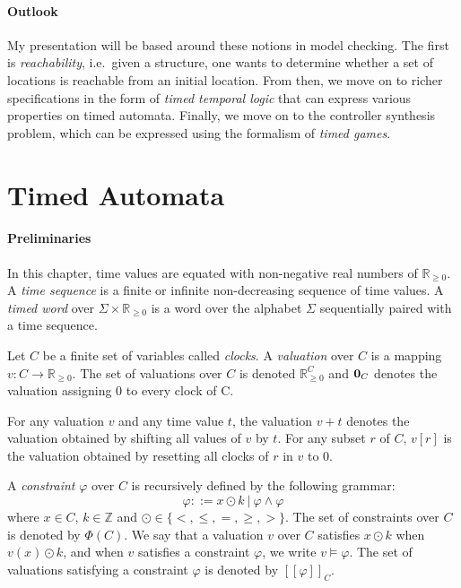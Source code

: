\documentclass[11pt]{article}
\theoremstyle{definition}
\theoremstyle{remark}
\theoremstyle{definition}
\begin{document}
\paragraph{Outlook} My presentation will be based around these notions in model checking. The first is \emph{reachability}, i.e.\ given a structure, one wants to determine whether a set of locations is reachable from an initial location.
From then, we move on to richer specifications in the form of \emph{timed temporal logic} that can express various properties on timed automata.
Finally, we move on to the controller synthesis problem, which can be expressed using the formalism of \emph{timed games}.

\section{Timed Automata}\label{sec:ta}
\paragraph{Preliminaries}\label{par:prelims}
In this chapter, time values are equated with non-negative real numbers of $\mathbb{R}_{\geq 0}$. A \emph{time sequence} is a finite or infinite non-decreasing sequence of time values.
A \emph{timed word} over $\Sigma \times \mathbb{R}_{\geq 0}$ is a word over the alphabet $\Sigma$ sequentially paired with a time sequence.

Let $C$ be a finite set of variables called \emph{clocks}. A \emph{valuation} over $C$ is a mapping $v \colon C \to \mathbb{R}_{\geq 0}$. The set of valuations over $C$ is denoted $\mathbb{R}_{\geq 0}^C$ and $\text{\bf 0}_C$ denotes the valuation assigning 0 to every clock of C.

For any valuation $v$ and any time value $t$, the valuation $v + t$ denotes the valuation obtained by shifting all values of $v$ by $t$. For any subset $r$ of $C$, $v[r]$ is the valuation obtained by resetting all clocks of $r$ in $v$ to $0$.

A \emph{constraint} $\varphi$ over $C$ is recursively defined by the following grammar:
\begin{equation*}
	\varphi ::= x \odot k\ |\ \varphi \land \varphi
\end{equation*}
where $x\in C$, $k \in \mathbb{Z}$ and $\odot \in \{<, \leq, =, \geq, >\}$.
The set of constraints over $C$ is denoted by $\Phi(C)$.
We say that a valuation $v$ over $C$ satisfies $x \odot k$ when $v(x) \odot k$, and when $v$ satisfies a constraint $\varphi$, we write $v \models \varphi$. The set of valuations satisfying a constraint $\varphi$ is denoted by $[\![\varphi]\!]_C$.
\end{document}
